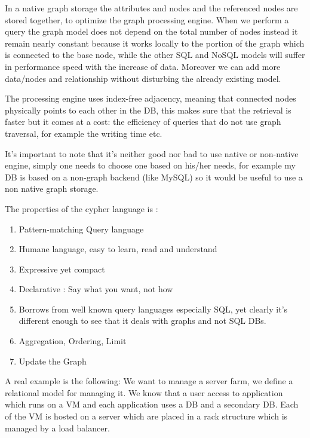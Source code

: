 \documentclass[a4page, 11pt]{article}
\begin{document}
In a native graph storage the attributes and nodes and the referenced nodes are stored together, to optimize the graph processing engine. 
When we perform a query the graph model does not depend on the total number of nodes instead it remain nearly constant because it works locally to the portion of the graph which is connected to the base node, while the other SQL and NoSQL models will suffer in performance speed with the
increase of data. Moreover we can add more data/nodes and relationship without disturbing the already existing model.

The processing engine uses index-free adjacency, meaning that connected nodes physically points to each other in the DB, this makes sure that the retrieval is faster but it comes at a cost: the efficiency of queries that do not use graph traversal, for example the writing time etc.

It's important to note that it's neither good nor bad to use native or non-native engine, simply one needs to choose one based on his/her needs, for example my DB is based on a non-graph backend (like MySQL) so it would be useful to use a non native graph storage.

The properties of the cypher language is :

\begin{enumerate}[noitemsep]
	 
	\item
	Pattern-matching Query language
	\item
	Humane language, easy to learn, read and understand
	\item
	Expressive yet compact
	\item
	Declarative : Say what you want, not how
	\item
	Borrows from well known query languages especially SQL, yet clearly it's different enough to see that it deals with graphs and not SQL	DBs.
	\item
	Aggregation, Ordering, Limit
	\item
	Update the Graph
\end{enumerate}

A real example is the following: We want to manage a server farm, we define a relational model for managing it. 
We know that a user access to application which runs on a VM and each application uses a DB and a secondary DB. 
Each of the VM is hosted on a server which are placed in a rack structure which is managed by a load balancer.
\end{document}

